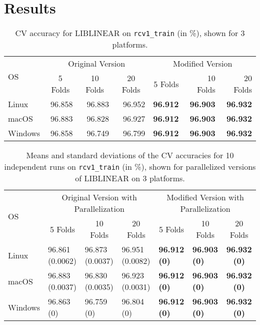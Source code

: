 \section{Results}
\begin{table}
  \centering
  {\footnotesize
    \def\arraystretch{1.2}
    \begin{tabular}{|l|rrr|rrr|}
      \hline
      \multirow{2}{*}{OS}
      & \multicolumn{3}{c|}{Original Version}
      & \multicolumn{3}{c|}{Modified Version}
        \tabularnewline
        \hhline{~------}
      & \multicolumn{1}{c}{5 Folds}
      & \multicolumn{1}{c}{10 Folds}
      & \multicolumn{1}{c|}{20 Folds}
      & 5 Folds
      & 10 Folds
      & 20 Folds
      \\ \hline
      Linux
      & 96.858
      & 96.883
      & 96.952
      & \bf 96.912
      & \bf 96.903
      & \bf 96.932
        \tabularnewline
        macOS
      & 96.883
      & 96.828
      & 96.927
      & \bf 96.912
      & \bf 96.903
      & \bf 96.932
        \tabularnewline
        Windows
      & 96.858
      & 96.749
      & 96.799
      & \bf 96.912
      & \bf 96.903
      & \bf 96.932
        \tabularnewline
        \hline
    \end{tabular}}
  \cprotect\caption{\label{tbl:RCV1-results-serial}
    CV accuracy for LIBLINEAR on \verb|rcv1_train| (in \%), shown for 3
    platforms.}
\end{table}
\begin{table}
  \centering
  {\footnotesize
    \def\arraystretch{1.2}
    \!\!\begin{tabular}{|l|lll|llc|}
      \hline
      \multirow{2}{*}{OS}
      & \multicolumn{3}{c|}{Original Version with Parallelization}
      & \multicolumn{3}{c|}{Modified Version with Parallelization}
        \tabularnewline
        \hhline{~------}
      & \multicolumn{1}{c}{5 Folds}
      & \multicolumn{1}{c}{10 Folds}
      & \multicolumn{1}{c|}{20 Folds}
      & \multicolumn{1}{c}{5 Folds}
      & \multicolumn{1}{c}{10 Folds}
      & \multicolumn{1}{c|}{20 Folds}
        \tabularnewline
        \hline
        Linux
      & 96.861 (0.0062)
      & 96.873 (0.0037)
      & 96.951 (0.0082)
      & \bf 96.912 (0)
      & \bf 96.903 (0)
      & \bf 96.932 (0)
        \tabularnewline
        macOS
      & 96.883 (0.0037)
      & 96.830 (0.0035)
      & 96.923 (0.0031)
      & \bf 96.912 (0)
      & \bf 96.903 (0)
      & \bf 96.932 (0)
        \tabularnewline
        Windows
      & 96.863 (0)
      & 96.759 (0)
      & 96.804 (0)
      & \bf 96.912 (0)
      & \bf 96.903 (0)
      & \bf 96.932 (0)
        \tabularnewline
        \hline
        \end{tabular}}
      \cprotect\caption{\label{tbl:RCV1-results-parallel}
        Means and standard deviations of the CV accuracies for
        10 independent runs on \verb|rcv1_train| (in \%), shown for
        parallelized versions of LIBLINEAR on 3 platforms.}
\end{table}

